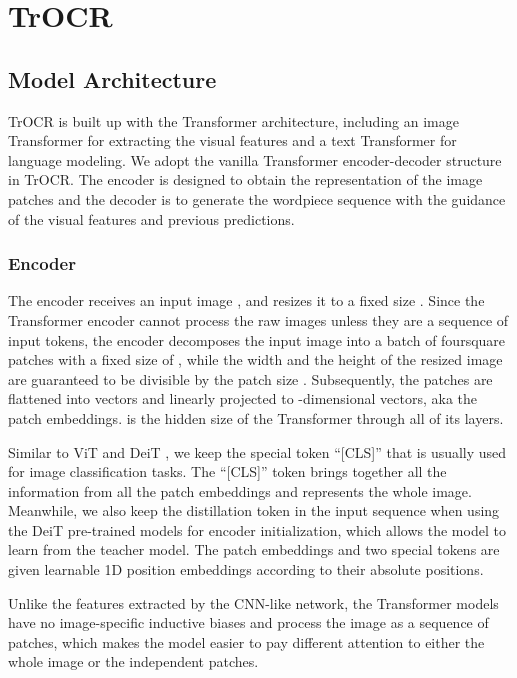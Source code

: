 \documentclass[letterpaper]{article} \usepackage{aaai23}  \usepackage{times}  \usepackage{helvet}  \usepackage{courier}  \usepackage[hyphens]{url}  \usepackage{graphicx} \urlstyle{rm} \def\UrlFont{\rm}  \usepackage{natbib}  \usepackage{caption} \frenchspacing  \setlength{\pdfpagewidth}{8.5in} \setlength{\pdfpageheight}{11in} \usepackage{algorithm}
\begin{document}
\section{TrOCR}


\subsection{Model Architecture}
TrOCR is built up with the Transformer architecture, including an image Transformer for extracting the visual features and a text Transformer for language modeling. We adopt the vanilla Transformer encoder-decoder structure in TrOCR. The encoder is designed to obtain the representation of the image patches and the decoder is to generate the wordpiece sequence with the guidance of the visual features and previous predictions. 

\subsubsection{Encoder}
The encoder receives an input image , and resizes it to a fixed size . Since the Transformer encoder cannot process the raw images unless they are a sequence of input tokens, the encoder decomposes the input image into a batch of  foursquare patches with a fixed size of ,
while the width  and the height  of the resized image are guaranteed to be divisible by the patch size . Subsequently, the patches are flattened into vectors and linearly projected to -dimensional vectors, aka the patch embeddings.  is the hidden size of the Transformer through all of its layers.

Similar to ViT \cite{dosovitskiy2020vit} and DeiT \cite{touvron2020deit}, we keep the special token ``[CLS]'' that is usually used for image classification tasks. The ``[CLS]'' token brings together all the information from all the patch embeddings and represents the whole image. Meanwhile, we also keep the distillation token in the input sequence when using the DeiT pre-trained models for encoder initialization, which allows the model to learn from the teacher model. The patch embeddings and two special tokens are given learnable 1D position embeddings according to their absolute positions. 












Unlike the features extracted by the CNN-like network, the Transformer models have no image-specific inductive biases and process the image as a sequence of patches, which makes the model easier to pay different attention to either the whole image or the independent patches.
\end{document}
